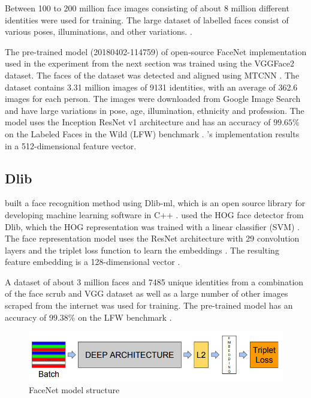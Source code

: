 \documentclass[12pt,english]{article}
\begin{document}
Between 100 to 200 million face images consisting of about 8 million different identities were used for training. The large dataset of labelled faces consist of various poses, illuminations, and other variations. \cite{schroff}.

The pre-trained model (20180402-114759) of open-source FaceNet implementation \cite{sandberg} used in the experiment from the next section was trained using the VGGFace2 dataset. The faces of the dataset was detected and aligned using MTCNN . The dataset contains 3.31 million images of 9131 identities, with an average of 362.6 images for each person. The images were downloaded from Google Image Search and have large variations in pose, age, illumination, ethnicity and profession. The model uses the Inception ResNet v1 architecture and has an accuracy of $99.65\%$ on the Labeled Faces in the Wild (LFW) benchmark \cite{sandberg}. \cite{sandberg}'s implementation results in a 512-dimensional feature vector.

\subsection{Dlib}
\quad
\cite{geitgey} built a face recognition method using Dlib-ml, which is an open source library for developing machine learning software in C++ \cite{king}. \cite{geitgey} used the HOG face detector from Dlib, which the HOG representation was trained with a linear classifier (SVM) \cite{king2014}. The face representation model uses the ResNet architecture with 29 convolution layers and the triplet loss function to learn the embeddings \cite{king2017}. The resulting feature embedding is a 128-dimensional vector \cite{king2017}. 

A dataset of about 3 million faces and 7485 unique identities from a combination of the face scrub and VGG dataset as well as a large number of other images scraped from the internet was used for training. The pre-trained model has an accuracy of $99.38\%$ on the LFW benchmark \cite{king2017}.

\begin{figure}[!tbp]
 \centering
    \includegraphics[width=\textwidth]{figures/facenet_model_archi.png}
    \caption{FaceNet model structure \cite{amos}}
	\label{fig:facemodel}
\end{figure}
\end{document}
